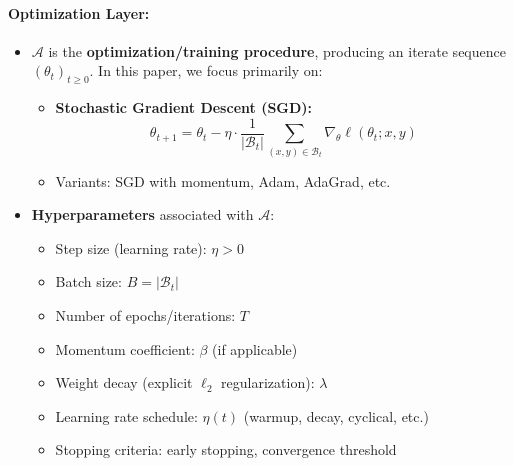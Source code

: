 \documentclass[
  journal=largetwo,
  simfonts=false,
  year=2025,
  volume=37,
]{cup-journal}
\begin{document}
\begin{setting}
\paragraph{Optimization Layer:}
\begin{itemize}
    \item $\mathcal{A}$ is the \textbf{optimization/training procedure}, producing an iterate sequence $(\theta_t)_{t\ge 0}$. In this paper, we focus primarily on:
    \begin{itemize}
        \item \textbf{Stochastic Gradient Descent (SGD):} $$\theta_{t+1} = \theta_t - \eta \cdot \frac{1}{|\mathcal{B}_t|}\sum_{(x,y)\in\mathcal{B}_t} \nabla_\theta \ell(\theta_t; x,y)$$
        \item Variants: SGD with momentum, Adam, AdaGrad, etc.
    \end{itemize}
    \item \textbf{Hyperparameters} associated with $\mathcal{A}$:
    \begin{itemize}
        \item Step size (learning rate): $\eta > 0$
        \item Batch size: $B = |\mathcal{B}_t|$
        \item Number of epochs/iterations: $T$
        \item Momentum coefficient: $\beta$ (if applicable)
        \item Weight decay (explicit $\ell_2$ regularization): $\lambda$
        \item Learning rate schedule: $\eta(t)$ (warmup, decay, cyclical, etc.)
        \item Stopping criteria: early stopping, convergence threshold
    \end{itemize}
\end{itemize}


\end{setting}
\end{document}
